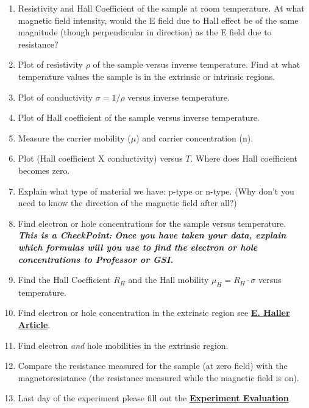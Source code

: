 \documentclass{../lab}
\begin{document}
\begin{enumerate}
    \item Resistivity and Hall Coefficient of the sample at room temperature. At what magnetic field intensity, would the E field due to Hall effect be of the same magnitude (though perpendicular in direction) as the E field due to resistance?

    \item Plot of resistivity $\rho$ of the sample versus inverse temperature. Find at what temperature values the sample is in the extrinsic or intrinsic regions.

    \item Plot of conductivity $\sigma = 1/\rho$ versus inverse temperature.

    \item Plot of Hall coefficient of the sample versus inverse temperature.

    \item Measure the carrier mobility ($\mu$) and carrier concentration (n).

    \item Plot (Hall coefficient X conductivity) versus $T$. Where does Hall coefficient becomes zero.

    \item Explain what type of material we have: p-type or n-type. (Why don't you need to know the direction of the magnetic field after all?)

    \item Find electron or hole concentrations for the sample versus temperature.\\
    \emph{\textbf{This is a CheckPoint:}} \emph{\textbf{Once you have taken your data, explain which formulas will you use to find the electron or hole concentrations to Professor or GSI.}}

    \item Find the Hall Coefficient $ R_H $ and the Hall mobility $\mu_H = R_H \cdot \sigma$ versus temperature.

    \item Find electron or hole concentration in the extrinsic region see \href{http://physics111.lib.berkeley.edu/Physics111/Reprints/SHE/24-Haller.pdf}{\textbf{E. Haller Article}}.

    \item Find electron \emph{and} hole mobilities in the extrinsic region.

    \item Compare the resistance measured for the sample (at zero field) with the magnetoresistance (the resistance measured while the magnetic field is on).

    \item Last day of the experiment please fill out the \href{\ExperimentEvaluation}{\textbf{Experiment Evaluation}}

\end{enumerate}
\end{document}
